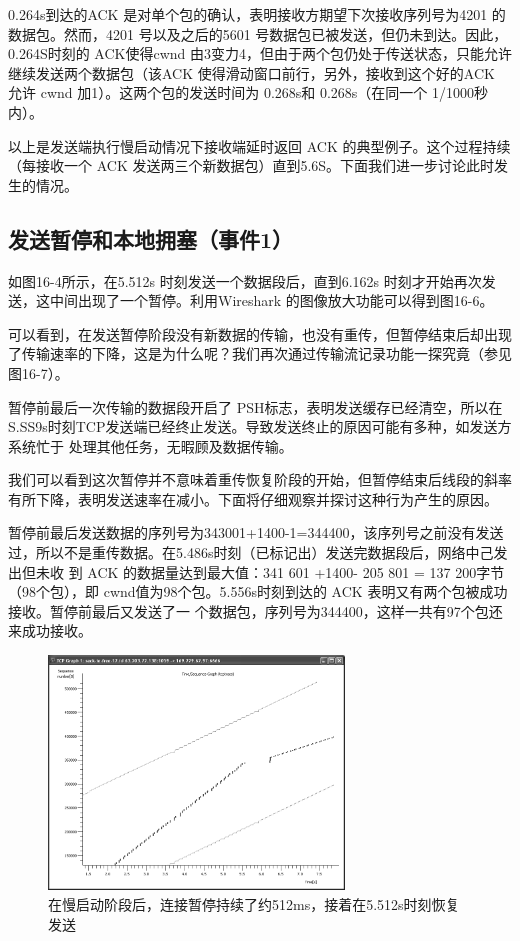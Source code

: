 0.264s到达的ACK 是对单个包的确认，表明接收方期望下次接收序列号为4201 的数据包。然而，4201 号以及之后的5601 号数据包已被发送，但仍未到达。因此，0.264S时刻的
ACK使得cwnd 由3变力4，但由于两个包仍处于传送状态，只能允许继续发送两个数据包（该ACK 使得滑动窗口前行，另外，接收到这个好的ACK 允许
cwnd 加1）。这两个包的发送时间为 0.268s和 0.268s（在同一个 1/1000秒内）。

以上是发送端执行慢启动情况下接收端延时返回 ACK 的典型例子。这个过程持续（每接收一个 ACK 发送两三个新数据包）直到5.6S。下面我们进一步讨论此时发生的情况。

\subsection{发送暂停和本地拥塞（事件1）}

如图16-4所示，在5.512s 时刻发送一个数据段后，直到6.162s 时刻才开始再次发送，这中间出现了一个暂停。利用Wireshark 的图像放大功能可以得到图16-6。

可以看到，在发送暂停阶段没有新数据的传输，也没有重传，但暂停结束后却出现了传输速率的下降，这是为什么呢？我们再次通过传输流记录功能一探究竟（参见图16-7）。

暂停前最后一次传输的数据段开启了 PSH标志，表明发送缓存已经清空，所以在S.SS9s时刻TCP发送端已经终止发送。导致发送终止的原因可能有多种，如发送方系统忙于
处理其他任务，无暇顾及数据传输。

我们可以看到这次暂停并不意味着重传恢复阶段的开始，但暂停结束后线段的斜率有所下降，表明发送速率在减小。下面将仔细观察并探讨这种行为产生的原因。

暂停前最后发送数据的序列号为343001+1400-1=344400，该序列号之前没有发送过，所以不是重传数据。在5.486s时刻（已标记出）发送完数据段后，网络中己发出但未收
到 ACK 的数据量达到最大值：341 601 +1400- 205 801 = 137 200字节（98个包），即 cwnd值为98个包。5.556s时刻到达的 ACK 表明又有两个包被成功接收。暂停前最后又发送了一
个数据包，序列号为344400，这样一共有97个包还来成功接收。

\begin{figure}[!htb]
    \centering
	\includegraphics[width=0.7\textwidth]{imgs/16/16-6.png}
	\caption{在慢启动阶段后，连接暂停持续了约512ms，接着在5.512s时刻恢复发送}
\end{figure}


